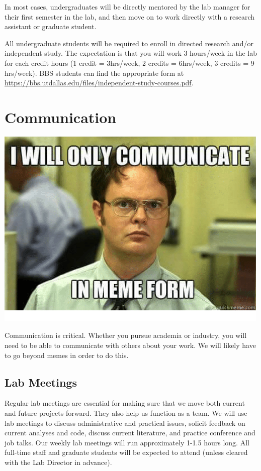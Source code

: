 \documentclass[]{book}
\begin{document}
In most cases, undergraduates will be directly mentored by the lab manager for their first semester in the lab, and then move on to work directly with a research assistant or graduate student.

All undergraduate students will be required to enroll in directed research and/or independent study. The expectation is that you will work 3 hours/week in the lab for each credit hours (1 credit = 3hrs/week, 2 credits = 6hrs/week, 3 credits = 9 hrs/week). BBS students can find the appropriate form at \url{https://bbs.utdallas.edu/files/independent-study-courses.pdf}.

\hypertarget{communication}{%
\chapter{Communication}\label{communication}}

\includegraphics{images/communication.png}

Communication is critical. Whether you pursue academia or industry, you will need to be able to communicate with others about your work. We will likely have to go beyond memes in order to do this.

\hypertarget{lab-meetings}{%
\section{Lab Meetings}\label{lab-meetings}}

Regular lab meetings are essential for making sure that we move both current and future projects forward. They also help us function as a team. We will use lab meetings to discuss administrative and practical issues, solicit feedback on current analyses and code, discuss current literature, and practice conference and job talks. Our weekly lab meetings will run approximately 1-1.5 hours long. All full-time staff and graduate students will be expected to attend (unless cleared with the Lab Director in advance).
\end{document}
